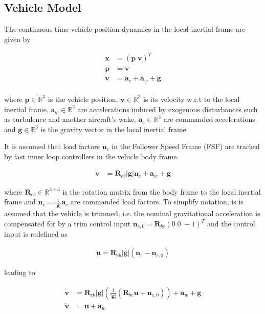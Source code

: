 \documentclass{ifacconf}
\providecommand{\mbf}[1]{\mathbf{#1}}
\begin{document}
\subsection{Vehicle Model}

The continuous time vehicle position dynamics in the local inertial frame are given by

\begin{align}
\mathbf{x} &= (\mbf{p} \; \mbf{v})^T \\
\dot{\mathbf{p}} &= \mbf{v}\\
\dot{\mbf{v}} &= \mbf{a}_{c} + \mbf{a}_w + \mbf{g}\\
\end{align}

where $\mbf{p} \in \mathbb{R}^3$ is the vehicle position, $\mbf{v} \in \mathbb{R}^3$ is its velocity w.r.t to the local inertial frame, $\mbf{a}_w \in \mathbb{R}^3$ are accelerations induced by exogenous disturbances such as turbulence and another aircraft's wake, $\mbf{a}_{c} \in \mathbb{R}^3$ are commanded accelerations and $\mbf{g} \in \mathbb{R}^3$ is the gravity vector in the local inertial frame.

It is assumed that load factors $\mbf{n}_c$ in the Follower Speed Frame (FSF) are tracked by fast inner loop controllers in the vehicle body frame.

\begin{align}
\dot{\mbf{v}} &= \mbf{R}_{eb} |\mbf{g}|\mbf{n}_c + \mbf{a}_w + \mbf{g}
\label{eq:svmloadfactorlevel}
\end{align}

where $\mbf{R}_{eb} \in \mathbb{R}^{3 \times 3}$ is the rotation matrix from the body frame to the local inertial frame and $\mbf{n}_c = \frac{1}{|\mbf{g}|} \mbf{a}_c$ are commanded load factors. To simplify notation, is is assumed that the vehicle is trimmed, i.e. the nominal gravitational acceleration is compensated for by a trim control input $\mbf{n}_{c,0} = \mbf{R}_{be}(0 \; 0 \; -1)^{T}$ and the control input is redefined as 

	\begin{align}
\mbf{u} = \mbf{R}_{eb} |\mbf{g}|(\mbf{n}_c - \mbf{n}_{c,0})	
\label{eq:defushort}
\end{align}

leading to 

\begin{align}
\dot{\mbf{v}} &= \mbf{R}_{eb}|\mbf{g}| 
(
\frac{1}{|\mbf{g}|}
(\mbf{R}_{be} \mbf{u} + \mbf{n}_{c,0})
) + \mbf{a}_w + \mbf{g}\\
\dot{\mbf{v}} &= \mbf{u} + \mbf{a}_w
\label{eq:svmshort}
\end{align}
\end{document}
